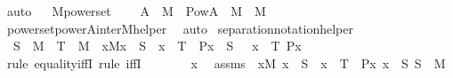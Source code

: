 \begin{isabellebody}
\ auto%
\endisatagproof
{\isafoldproof}%
%
\isadelimproof
\ \isanewline
%
\endisadelimproof
\isanewline
{}\isamarkupfalse%
\ M{\isacharunderscore}{\kern0pt}powerset\ {\isacharcolon}{\kern0pt}\ \isanewline
\ \ {\isachardoublequoteopen}A\ {\isasymin}\ M\ {\isasymLongrightarrow}\ {\isacharparenleft}{\kern0pt}Pow{\isacharparenleft}{\kern0pt}A{\isacharparenright}{\kern0pt}\ {\isasyminter}\ M{\isacharparenright}{\kern0pt}\ {\isasymin}\ M{\isachardoublequoteclose}\ \isanewline
%
\isadelimproof
\ \ %
\endisadelimproof
%
\isatagproof
{}\isamarkupfalse%
\ powerset{\isacharunderscore}{\kern0pt}powerA{\isacharunderscore}{\kern0pt}inter{\isacharunderscore}{\kern0pt}M{\isacharunderscore}{\kern0pt}helper\ \isamarkupfalse%
\ auto%
\endisatagproof
{\isafoldproof}%
%
\isadelimproof
\isanewline
%
\endisadelimproof
\isanewline
{}\isamarkupfalse%
\ separation{\isacharunderscore}{\kern0pt}notation{\isacharunderscore}{\kern0pt}helper\ {\isacharcolon}{\kern0pt}\isanewline
\ \ {\isachardoublequoteopen}S\ {\isasymin}\ M\ {\isasymLongrightarrow}\ T\ {\isasymin}\ M\ {\isasymLongrightarrow}\ {\isasymforall}x{\isacharbrackleft}{\kern0pt}{\isacharhash}{\kern0pt}{\isacharhash}{\kern0pt}M{\isacharbrackright}{\kern0pt}{\isachardot}{\kern0pt}{\isacharparenleft}{\kern0pt}x\ {\isasymin}\ S\ {\isasymlongleftrightarrow}\ x\ {\isasymin}\ T\ {\isasymand}\ P{\isacharparenleft}{\kern0pt}x{\isacharparenright}{\kern0pt}{\isacharparenright}{\kern0pt}\ {\isasymLongrightarrow}\ S\ {\isacharequal}{\kern0pt}\ {\isacharbraceleft}{\kern0pt}\ x\ {\isasymin}\ T{\isachardot}{\kern0pt}\ P{\isacharparenleft}{\kern0pt}x{\isacharparenright}{\kern0pt}\ {\isacharbraceright}{\kern0pt}{\isachardoublequoteclose}\ \isanewline
%
\isadelimproof
\ \ %
\endisadelimproof
%
\isatagproof
{}\isamarkupfalse%
\ {\isacharparenleft}{\kern0pt}rule\ equality{\isacharunderscore}{\kern0pt}iffI{\isacharsemicolon}{\kern0pt}\ rule\ iffI{\isacharparenright}{\kern0pt}\ \isanewline
{}\isamarkupfalse%
\ {\isacharminus}{\kern0pt}\ \isanewline
\ \ \isamarkupfalse%
\ x\ \isamarkupfalse%
\ assms\ {\isacharcolon}{\kern0pt}\ {\isachardoublequoteopen}{\isasymforall}x{\isacharbrackleft}{\kern0pt}{\isacharhash}{\kern0pt}{\isacharhash}{\kern0pt}M{\isacharbrackright}{\kern0pt}{\isachardot}{\kern0pt}\ x\ {\isasymin}\ S\ {\isasymlongleftrightarrow}\ x\ {\isasymin}\ T\ {\isasymand}\ P{\isacharparenleft}{\kern0pt}x{\isacharparenright}{\kern0pt}{\isachardoublequoteclose}\ {\isachardoublequoteopen}x\ {\isasymin}\ S{\isachardoublequoteclose}\ {\isachardoublequoteopen}S\ {\isasymin}\ M{\isachardoublequoteclose}\isanewline

\end{isabellebody}
